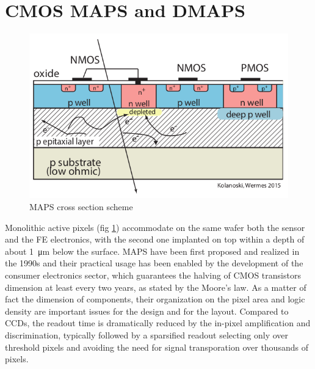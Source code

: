 \section{CMOS MAPS and DMAPS}\label{sec:MAPS_DMAPS}
   \begin{figure}[b]
      \centering
      \includegraphics[width=\linewidth]{figures/Pixel_detectors/MAPS_scheme.png}  
      \caption{MAPS cross section scheme}
      \label{fig:MAPS_scheme}
   \end{figure}
   Monolithic active pixels (fig \ref{fig:MAPS_scheme}) accommodate on the same wafer both the sensor and the FE electronics, with the second one implanted on top within a depth of about \SI{1}{\um} below the surface. 
   MAPS have been first proposed and realized in the 1990s and their practical usage has been enabled by the development of the consumer electronics sector, which guarantees the halving of CMOS transistors dimension at least every two years, as stated by the Moore's law.
   As a matter of fact the dimension of components, their organization on the pixel area and logic density are important issues for the design and for the layout.
   Compared to CCDs, the readout time is dramatically reduced by the in-pixel amplification and discrimination, typically followed by a sparsified readout selecting only over threshold pixels and avoiding the need for signal transporation over thousands of pixels.

